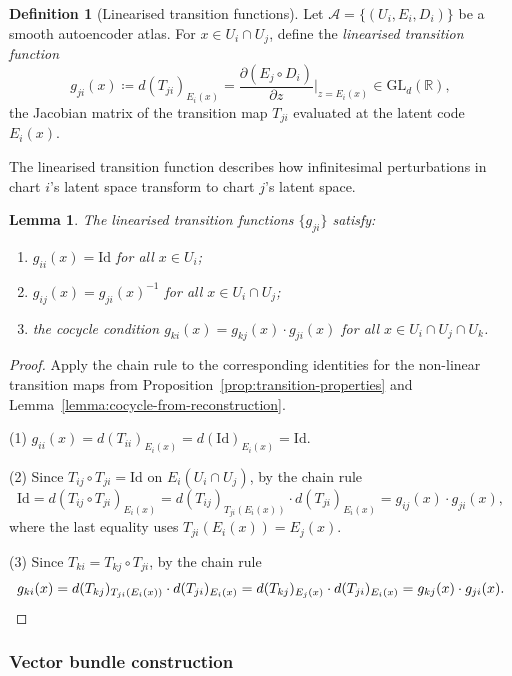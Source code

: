 \documentclass[11pt]{article}
\newcommand{\R}{\mathbb{R}}
\newcommand{\GL}{\mathrm{GL}}
\theoremstyle{plain}
\newtheorem{lemma}[theorem]{Lemma}
\theoremstyle{definition}
\newtheorem{definition}[theorem]{Definition}
\theoremstyle{remark}
\begin{document}
\begin{definition}[Linearised transition functions]
Let $\mathcal{A} = \{(U_i, E_i, D_i)\}$ be a smooth autoencoder atlas. For $x \in U_i \cap U_j$, define the \emph{linearised transition function}
\[
g_{ji}(x) \coloneqq d(T_{ji})_{E_i(x)} = \frac{\partial(E_j \circ D_i)}{\partial z}\Big|_{z=E_i(x)} \in \GL_d(\R),
\]
the Jacobian matrix of the transition map $T_{ji}$ evaluated at the latent code $E_i(x)$.
\end{definition}

The linearised transition function describes how infinitesimal perturbations in chart $i$'s latent space transform to chart $j$'s latent space.

\begin{lemma}\label{lemma:linearised-cocycle}
The linearised transition functions $\{g_{ji}\}$ satisfy:
\begin{enumerate}
\item $g_{ii}(x) = \mathrm{Id}$ for all $x \in U_i$;
\item $g_{ij}(x) = g_{ji}(x)^{-1}$ for all $x \in U_i \cap U_j$;
\item the cocycle condition $g_{ki}(x) = g_{kj}(x) \cdot g_{ji}(x)$ for all $x \in U_i \cap U_j \cap U_k$.
\end{enumerate}
\end{lemma}

\begin{proof}
Apply the chain rule to the corresponding identities for the non-linear transition maps from Proposition~\ref{prop:transition-properties} and Lemma~\ref{lemma:cocycle-from-reconstruction}.

(1) $g_{ii}(x) = d(T_{ii})_{E_i(x)} = d(\mathrm{Id})_{E_i(x)} = \mathrm{Id}$.

(2) Since $T_{ij} \circ T_{ji} = \mathrm{Id}$ on $E_i(U_i \cap U_j)$, by the chain rule
\[
\mathrm{Id} = d(T_{ij} \circ T_{ji})_{E_i(x)} = d(T_{ij})_{T_{ji}(E_i(x))} \cdot d(T_{ji})_{E_i(x)} = g_{ij}(x) \cdot g_{ji}(x),
\]
where the last equality uses $T_{ji}(E_i(x)) = E_j(x)$.

(3) Since $T_{ki} = T_{kj} \circ T_{ji}$, by the chain rule
\[
g_{ki}(x) = d(T_{kj})_{T_{ji}(E_i(x))} \cdot d(T_{ji})_{E_i(x)} = d(T_{kj})_{E_j(x)} \cdot d(T_{ji})_{E_i(x)} = g_{kj}(x) \cdot g_{ji}(x). \qedhere
\]
\end{proof}

\subsubsection{Vector bundle construction}
\end{document}
